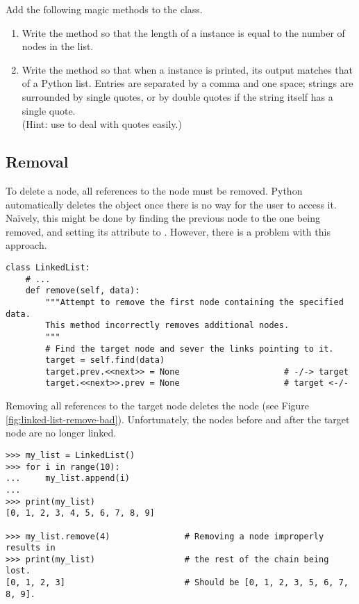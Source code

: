 \begin{problem} %
Add the following magic methods to the  class.
\begin{enumerate}
\item Write the  method so that the length of a  instance is equal to the number of nodes in the list.

\item Write the  method so that when a  instance is printed, its output matches that of a Python list.
Entries are separated by a comma and one space; strings are surrounded by single quotes, or by double quotes if the string itself has a single quote.
\\(Hint: use  to deal with quotes easily.)
\end{enumerate}
\end{problem}

\subsection*{Removal} %

To delete a node, all references to the node must be removed.
Python automatically deletes the object once there is no way for the user to access it.
Na{\"i}vely, this might be done by finding the previous node to the one being removed, and setting its  attribute to .
However, there is a problem with this approach.

\begin{lstlisting}
class LinkedList:
    # ...
    def remove(self, data):
        """Attempt to remove the first node containing the specified data.
        This method incorrectly removes additional nodes.
        """
        # Find the target node and sever the links pointing to it.
        target = self.find(data)
        target.prev.<<next>> = None                     # -/-> target
        target.<<next>>.prev = None                     # target <-/-
\end{lstlisting}

Removing all references to the target node deletes the node (see Figure \ref{fig:linked-list-remove-bad}).
Unfortunately, the nodes before and after the target node are no longer linked.

\begin{lstlisting}
>>> my_list = LinkedList()
>>> for i in range(10):
...     my_list.append(i)
...
>>> print(my_list)
[0, 1, 2, 3, 4, 5, 6, 7, 8, 9]

>>> my_list.remove(4)               # Removing a node improperly results in
>>> print(my_list)                  # the rest of the chain being lost.
[0, 1, 2, 3]                        # Should be [0, 1, 2, 3, 5, 6, 7, 8, 9].
\end{lstlisting}


